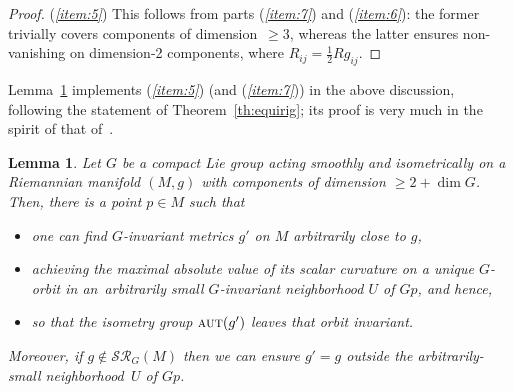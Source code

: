 \documentclass[10pt,a4paper]{amsart}
\numberwithin{equation}{section}
\newtheorem{Lemma}[Theorem]{Lemma}
\newcommand{\cat}[1]{\textsc{#1}}
\begin{document}
\begin{proof}
 ({\it \ref{item:5}}) This follows from parts ({\it \ref{item:7}}) and ({\it \ref{item:6}}): the former trivially covers components of dimen\-sion~\mbox{$\ge 3$}, whereas the latter ensures non-vanishing on dimension-2 components, where $R_{ij} = \frac 12 Rg_{ij}$.
\end{proof}

Lemma~\ref{le:1invorb} implements ({\it \ref{item:5}}) (and ({\it \ref{item:7}})) in the above discussion, following the statement of Theo\-rem~\ref{th:equirig}; its proof is very much in the spirit of that of~\cite[Proposition~8.3]{eb}.

\begin{Lemma}\label{le:1invorb}
 Let $G$ be a compact Lie group acting smoothly and isometrically on a Riemannian manifold $(M,g)$ with components of dimension $\ge 2+\dim G$. Then, there is a point $p\in M$ such that
 \begin{itemize}\itemsep=0pt
 \item one can find $G$-invariant metrics $g'$ on $M$ arbitrarily close to $g$,
 \item achieving the maximal absolute value of its scalar curvature on a unique $G$-orbit in an~arbi\-trarily small $G$-invariant neighborhood $U$ of $Gp$, and hence,
 \item so that the isometry group $\cat{aut}(g')$ leaves that orbit invariant.
 \end{itemize}
 Moreover, if $g\not\in \mathcal{SR}_G(M)$ then we can ensure $g'= g$ outside the arbitrarily-small neighborhood~$U$ of $Gp$.
\end{Lemma}
\end{document}
